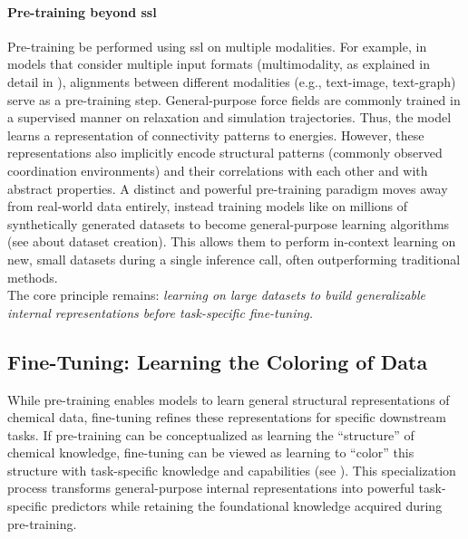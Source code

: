 \paragraph{Pre-training beyond \gls{ssl}}
Pre-training be performed using \gls{ssl} on multiple modalities.  For example, in models that consider multiple input formats (multimodality, as explained in detail in ), alignments between different modalities (e.g., text-image, text-graph) serve as a pre-training step.\autocite{weng2022vlm,girdhar2023imagebind0}  
General-purpose force fields are commonly trained in a supervised manner on relaxation and simulation trajectories.\autocite{batatia2022mace, wood2025uma0}
Thus, the model learns a representation of connectivity patterns to energies. 
However, these representations also implicitly encode structural patterns (commonly observed coordination environments) and their correlations with each other and with abstract properties. 
A distinct and powerful pre-training paradigm moves away from real-world data entirely, instead training models like  on millions of synthetically generated datasets to become general-purpose learning algorithms (see  about dataset creation). 
This allows them to perform in-context learning on new, small datasets during a single inference call, often outperforming traditional methods. \autocite{hollmann2025accurate} \\

\noindent The core principle remains: \emph{learning on large datasets to build generalizable internal representations before task-specific fine-tuning.}

\subsection{Fine-Tuning: Learning the Coloring of Data}
\label{sec:fine_tuning_coloring}

While pre-training enables models to learn general structural representations of chemical data, fine-tuning refines these representations for specific downstream tasks.
If pre-training can be conceptualized as learning the \enquote{structure} of chemical knowledge, fine-tuning can be viewed as learning to \enquote{color} this structure with task-specific knowledge and capabilities (see ). 
This specialization process transforms general-purpose internal representations into powerful task-specific predictors while retaining the foundational knowledge acquired during pre-training.

